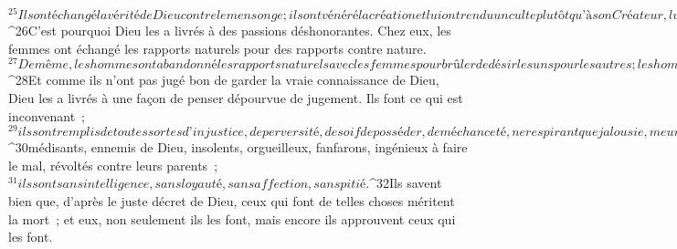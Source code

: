 ${}^{25}Ils ont échangé la vérité de Dieu contre le mensonge ; ils ont vénéré la création et lui ont rendu un culte plutôt qu’à son Créateur, lui qui est béni éternellement. Amen.
${}^{26}C’est pourquoi Dieu les a livrés à des passions déshonorantes. Chez eux, les femmes ont échangé les rapports naturels pour des rapports contre nature. 
${}^{27}De même, les hommes ont abandonné les rapports naturels avec les femmes pour brûler de désir les uns pour les autres ; les hommes font avec les hommes des choses infâmes, et ils reçoivent en retour dans leur propre personne le salaire dû à leur égarement. 
${}^{28}Et comme ils n’ont pas jugé bon de garder la vraie connaissance de Dieu, Dieu les a livrés à une façon de penser dépourvue de jugement. Ils font ce qui est inconvenant ; 
${}^{29}ils sont remplis de toutes sortes d’injustice, de perversité, de soif de posséder, de méchanceté, ne respirant que jalousie, meurtre, rivalité, ruse, dépravation ; ils sont détracteurs, 
${}^{30}médisants, ennemis de Dieu, insolents, orgueilleux, fanfarons, ingénieux à faire le mal, révoltés contre leurs parents ; 
${}^{31}ils sont sans intelligence, sans loyauté, sans affection, sans pitié. 
${}^{32}Ils savent bien que, d’après le juste décret de Dieu, ceux qui font de telles choses méritent la mort ; et eux, non seulement ils les font, mais encore ils approuvent ceux qui les font.
      

